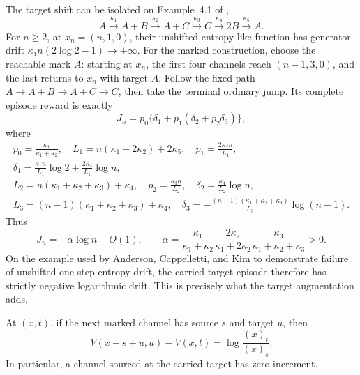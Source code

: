 \begin{remark}\label{rem:ack-example}
The target shift can be isolated on Example~4.1 of
\citet{AndersonCappellettiKim2020},
\[
 A\xrightarrow{\kappa_1}A+B\xrightarrow{\kappa_2}A+C
 \xrightarrow{\kappa_3}C\xrightarrow{\kappa_4}2B
 \xrightarrow{\kappa_5}A.
\]
For \(n\ge2\), at \(x_n=(n,1,0)\), their unshifted entropy-like function has
generator drift \(\kappa_1n(2\log2-1)\to+\infty\).  For the marked construction,
choose the reachable mark \(A\): starting at \(x_n\), the first four channels
reach \((n-1,3,0)\), and the last returns to \(x_n\) with target \(A\).
Follow the fixed path \(A\to A+B\to A+C\to C\), then take the terminal
ordinary jump.  Its complete episode reward is exactly
\begin{equation}\label{eq:ack-episode}
 J_n=p_0\{\delta_1+p_1(\delta_2+p_2\delta_3)\},
\end{equation}
where
\[
\begin{gathered}
 p_0=\frac{\kappa_1}{\kappa_1+\kappa_2},\quad
 L_1=n(\kappa_1+2\kappa_2)+2\kappa_5,\quad
 p_1=\frac{2\kappa_2n}{L_1},\\
 \delta_1=\frac{\kappa_1n}{L_1}\log2
       +\frac{2\kappa_5}{L_1}\log n,\\
 L_2=n(\kappa_1+\kappa_2+\kappa_3)+\kappa_4,\quad
 p_2=\frac{\kappa_3n}{L_2},\quad
 \delta_2=\frac{\kappa_4}{L_2}\log n,\\
 L_3=(n-1)(\kappa_1+\kappa_2+\kappa_3)+\kappa_4,\quad
 \delta_3=-\frac{(n-1)(\kappa_1+\kappa_2+\kappa_3)}{L_3}\log(n-1).
\end{gathered}
\]
Thus
\[
 J_n=-\alpha\log n+O(1),\qquad
 \alpha=\frac{\kappa_1}{\kappa_1+\kappa_2}
        \frac{2\kappa_2}{\kappa_1+2\kappa_2}
        \frac{\kappa_3}{\kappa_1+\kappa_2+\kappa_3}>0.
\]
On the example used by Anderson, Cappelletti, and Kim to demonstrate failure
of unshifted one-step entropy drift, the carried-target episode therefore has
strictly negative logarithmic drift.  This is precisely what the target
augmentation adds.
\end{remark}

\begin{lemma}\label{lem:identity}
At \((x,t)\), if the next marked channel has source \(s\) and target \(u\),
then
\begin{equation}\label{eq:identity}
  V(x-s+u,u)-V(x,t)=\log\frac{(x)_t}{(x)_s}.
\end{equation}
In particular, a channel sourced at the carried target has zero increment.
\end{lemma}

